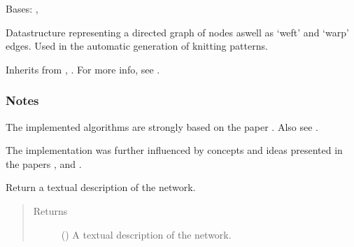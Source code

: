 \documentclass[letterpaper,10pt,english]{sphinxmanual}
\begin{document}
\begin{fulllineitems}
\label{\detokenize{cockatoo:cockatoo.KnitDiNetwork}}
Bases: , 

Datastructure representing a directed graph of nodes aswell as ‘weft’
and ‘warp’ edges. Used in the automatic generation of knitting patterns.

Inherits from , {\hyperref[\detokenize{cockatoo:cockatoo.KnitNetworkBase}]{}}.
For more info, see  \sphinxfootnotemark[13].
\subsubsection*{Notes}

The implemented algorithms are strongly based on the paper
 \sphinxfootnotemark[1].
Also see  \sphinxfootnotemark[2].

The implementation was further influenced by concepts and ideas presented
in the papers  \sphinxfootnotemark[3],
 \sphinxfootnotemark[4] and
 \sphinxfootnotemark[5].

\begin{fulllineitems}
\label{\detokenize{cockatoo:cockatoo.KnitDiNetwork.ToString}}
Return a textual description of the network.
\begin{quote}\begin{description}
\item[{Returns}] \leavevmode
{} () \textendash{} A textual description of the network.


\end{description}
\end{quote}
\end{fulllineitems}
\end{fulllineitems}
\end{document}
